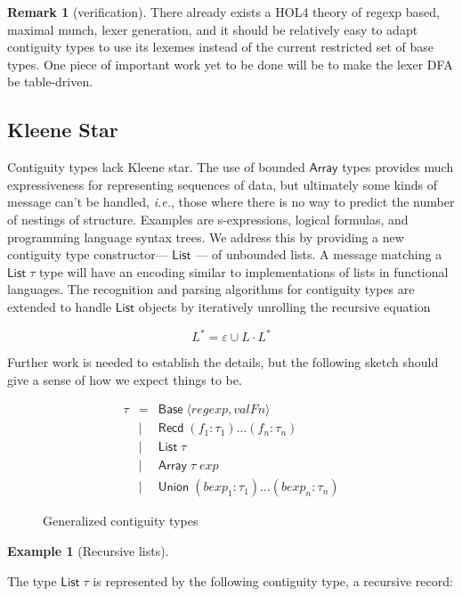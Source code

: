 \documentclass{article}
\newcommand{\ie}{\textit{i.e.}}
\newcommand{\konst}[1]{\ensuremath{\mathsf{#1}}}
\newcommand{\kstar}[1]{\ensuremath{{#1}^{*}}}
\theoremstyle{definition}
\newtheorem*{example}{Example}
\newtheorem*{remark}{Remark}
\begin{document}
\begin{remark} [verification] There already exists a
  HOL4 theory of regexp based, maximal munch, lexer generation,
  and it should be relatively easy to adapt contiguity types to use
  its lexemes instead of the current restricted set of base types. One
  piece of important work yet to be done will be to make the lexer DFA
  be table-driven.
\end{remark}

\subsection{Kleene Star}
  Contiguity types lack Kleene star. The use of bounded \konst{Array}
  types provides much expressiveness for representing sequences of
  data, but ultimately some kinds of message can't be handled, \ie,
  those where there is no way to predict the number of nestings of
  structure. Examples are s-expressions, logical formulas, and
  programming language syntax trees. We address this by providing a
  new contiguity type constructor--- \konst{List} --- of unbounded
  lists. A message matching a $\konst{List}\;\tau$ type will have an
  encoding similar to implementations of lists in functional
  languages. The recognition and parsing algorithms for contiguity
  types are extended to handle \konst{List} objects by iteratively
  unrolling the recursive equation

\[ \kstar{L} = \varepsilon \cup L \cdot \kstar{L} \]

Further work is needed to establish the details, but the following
sketch should give a sense of how we expect things to be.

\begin{figure}
\[
\begin{array}{rcl}
 \tau & =    & \konst{Base}\; \langle \mathit{regexp}, \mathit{valFn} \rangle \\
      & \mid & \konst{Recd}\; (f_1 : \tau_1) \ldots (f_n : \tau_n) \\
      & \mid & \konst{List}\; \tau \\
      & \mid & \konst{Array}\; \tau \; \mathit{exp} \\
      & \mid & \konst{Union}\; (\mathit{bexp}_1 : \tau_1) \ldots (\mathit{bexp}_n : \tau_n)
\end{array}
\]
\caption{Generalized contiguity types}
\label{gen-contig-types}
\end{figure}

\begin{example}[Recursive lists]

\end{example}
The type $\konst{List}\;\tau$ is represented by the following
contiguity type, a recursive record:
\end{document}
